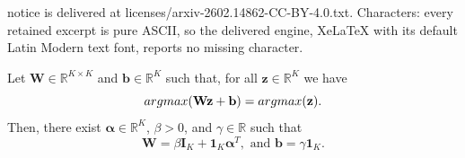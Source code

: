 \documentclass[10pt,a4paper]{amsart}
\newcommand{\bI}{\mathbf{I}}%
\newcommand{\bW}{\mathbf{W}}%
\newcommand{\ba}{\boldsymbol{\alpha}}%
\newcommand{\bb}{\mathbf{b}}%
\newcommand{\bun}{\mathbf{1}}%
\newcommand{\bz}{\mathbf{z}}%
\begin{document}
notice is delivered at licenses/arxiv-2602.14862-CC-BY-4.0.txt. Characters: every retained excerpt is pure ASCII, so the delivered engine, XeLaTeX with its default Latin Modern text font, reports no missing character.
\begin{theorem}
    Let $\bW \in \mathbb{R}^{K \times K}$ and  $\bb \in \mathbb{R}^K$ such that, for all $\bz \in \mathbb{R}^K$ we have
    \begin{equation}
    \label{eq:invarianceapp}
        \textup{argmax}(\bW \bz+\bb) = \textup{argmax}(\bz).
    \end{equation}
Then, there exist $\ba \in \mathbb{R}^K$, $\beta> 0$, and $\gamma \in \mathbb{R}$ such that
\begin{equation}
    \bW = \beta \bI_K + \bun_K \ba ^T, \text{ and } \bb = \gamma \bun_K.
\end{equation}
\end{theorem}
\end{document}
